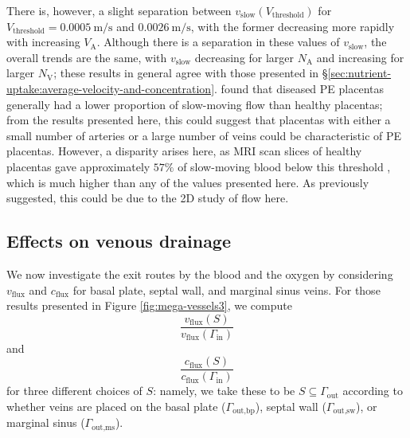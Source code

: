             There is, however, a slight separation between $v_\text{slow}(V_\text{threshold})$ for $V_\text{threshold} = \qty{0.0005}{\metre\per\second}$ and $\qty{0.0026}{\metre\per\second}$, with the former decreasing more rapidly with increasing $V_\text{A}$. Although there is a separation in these values of $v_\text{slow}$, the overall trends are the same, with $v_\text{slow}$ decreasing for larger $N_\text{A}$ and increasing for larger $N_\text{V}$; these results in general agree with those presented in \S\ref{sec:nutrient-uptake:average-velocity-and-concentration}. \citeauthor{dellschaftHaemodynamicsHumanPlacenta2020} \cite{dellschaftHaemodynamicsHumanPlacenta2020} found that diseased PE placentas generally had a lower proportion of slow-moving flow than healthy placentas; from the results presented here, this could suggest that placentas with either a small number of arteries or a large number of veins could be characteristic of PE placentas. However, a disparity arises here, as MRI scan slices of healthy placentas gave approximately $57\%$ of slow-moving blood below this threshold \cite{dellschaftHaemodynamicsHumanPlacenta2020}, which is much higher than any of the values presented here. As previously suggested, this could be due to the 2D study of flow here.

        \subsection{Effects on venous drainage}
            We now investigate the exit routes by the blood and the oxygen by considering $v_\text{flux}$ and $c_\text{flux}$ for basal plate, septal wall, and marginal sinus veins. For those results presented in Figure \ref{fig:mega-vessels3}, we compute
            \begin{equation*}
                \frac{v_\text{flux}(S)}{v_\text{flux}(\Gamma_\text{in})}
            \end{equation*}
            and
            \begin{equation*}
                \frac{c_\text{flux}(S)}{c_\text{flux}(\Gamma_\text{in})}
            \end{equation*}
            for three different choices of $S$: namely, we take these to be $S \subseteq \Gamma_\text{out}$ according to whether veins are placed on the basal plate ($\Gamma_\text{out,bp}$), septal wall ($\Gamma_\text{out,sw}$), or marginal sinus ($\Gamma_\text{out,ms}$).

